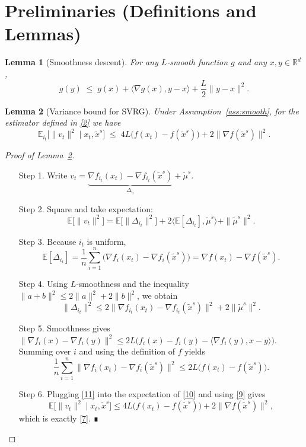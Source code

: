 \documentclass{article}
\newtheorem{lemma}{Lemma}
\newcommand{\E}{\mathbb{E}}
\newcommand{\R}{\mathbb{R}}
\begin{document}
\section*{Preliminaries (Definitions and Lemmas)}
\begin{lemma}[Smoothness descent]\label{lem:smooth}
For any $L$‑smooth function $g$ and any $x,y\in\R^{d}$,
\[
g(y)\;\le\;g(x)+\langle\nabla g(x),y-x\rangle+\frac{L}{2}\|y-x\|^{2}.
\tag{6}
\]
\end{lemma}
\begin{lemma}[Variance bound for SVRG]\label{lem:var}
Under Assumption~\ref{ass:smooth}, for the estimator defined in \eqref{2} we have
\[
\E_{i_t}\!\big[\|v_t\|^{2}\mid x_t,\tilde{x}^{s}\big]
\;\le\;
4L\big(f(x_t)-f(\tilde{x}^{s})\big)+2\|\nabla f(\tilde{x}^{s})\|^{2}.
\tag{7}
\]
\end{lemma}
\begin{proof}[Proof of Lemma~\ref{lem:var}]
\begin{enumerate}
\item[Step 1.] Write $v_t=\underbrace{\nabla f_{i_t}(x_t)-\nabla f_{i_t}(\tilde{x}^{s})}_{\Delta_{i_t}}+\tilde{\mu}^{s}$.
\item[Step 2.] Square and take expectation:
\[
\E\big[\|v_t\|^{2}\big]
= \E\big[\|\Delta_{i_t}\|^{2}\big]+2\langle\E[\Delta_{i_t}],\tilde{\mu}^{s}\rangle+\|\tilde{\mu}^{s}\|^{2}.
\tag{8}
\]
\item[Step 3.] Because $i_t$ is uniform,
\[
\E[\Delta_{i_t}] = \frac1n\sum_{i=1}^{n}\big(\nabla f_i(x_t)-\nabla f_i(\tilde{x}^{s})\big)
= \nabla f(x_t)-\nabla f(\tilde{x}^{s}).
\tag{9}
\]
\item[Step 4.] Using $L$‑smoothness and the inequality $\|a+b\|^{2}\le 2\|a\|^{2}+2\|b\|^{2}$, we obtain
\[
\|\Delta_{i_t}\|^{2}
\le 2\|\nabla f_{i_t}(x_t)-\nabla f_{i_t}(\tilde{x}^{s})\|^{2}
   +2\|\tilde{\mu}^{s}\|^{2}.
\tag{10}
\]
\item[Step 5.] Smoothness gives $\|\nabla f_i(x)-\nabla f_i(y)\|^{2}\le 2L\big(f_i(x)-f_i(y)-\langle\nabla f_i(y),x-y\rangle\big)$.
Summing over $i$ and using the definition of $f$ yields
\[
\frac1n\sum_{i=1}^{n}\|\nabla f_i(x_t)-\nabla f_i(\tilde{x}^{s})\|^{2}
\le 2L\big(f(x_t)-f(\tilde{x}^{s})\big).
\tag{11}
\]
\item[Step 6.] Plugging \eqref{11} into the expectation of \eqref{10} and using \eqref{9} gives
\[
\E\big[\|v_t\|^{2}\mid x_t,\tilde{x}^{s}\big]
\le 4L\big(f(x_t)-f(\tilde{x}^{s})\big)+2\|\nabla f(\tilde{x}^{s})\|^{2},
\]
which is exactly \eqref{7}.  ∎
\end{enumerate}
\end{proof}
\end{document}
